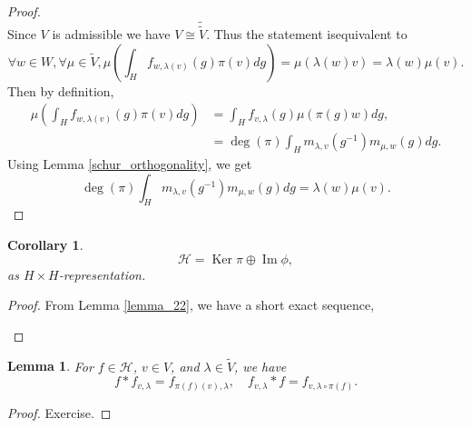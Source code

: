 \documentclass[8pt]{article}
\newtheorem{lemma}{Lemma}[section]
\newtheorem{corollary}{Corollary} [section]
\DeclareMathOperator{\End}{End}
\DeclareMathOperator{\Image}{Im}
\DeclareMathOperator{\Ker}{Ker}
\newcommand{\C}[0]{\mathbb{C}}
\newcommand{\hecke}[0]{\mathscr{H}}
\begin{document}
\begin{proof}
\begin{equation*}
  \end{equation*}
  Since $V$ is admissible we have $V\cong \widetilde{\widetilde{V}}$. Thus the statement isequivalent to 
  \begin{equation*}
    \forall w\in W,\forall\mu\in\widetilde{V},\mu\left(\int_Hf_{w,\lambda(v)}(g)\pi(v)dg\right) = \mu(\lambda(w)v) = \lambda(w)\mu(v).
    \end{equation*}
    Then by definition,
    \begin{align*}
      \mu\left(\int_Hf_{w,\lambda(v)}(g)\pi(v)dg\right) & = \int_H f_{v,\lambda}(g)\mu(\pi(g)w)dg,\\
      & = \deg(\pi)\int_Hm_{\lambda,v}(g^{-1})m_{\mu,w}(g)dg.
    \end{align*}
    Using Lemma \ref{schur_orthogonality}, we get 
    \begin{equation*}
      \deg(\pi)\int_Hm_{\lambda,v}(g^{-1})m_{\mu,w}(g)dg = \lambda(w)\mu(v).
    \end{equation*}
\end{proof}

\begin{corollary}
  \label{corollary_23}
  \begin{equation*}
    \hecke = \Ker\pi\oplus\Image\phi,
  \end{equation*}
  as $H\times H$-representation.
\end{corollary}

\begin{proof}
  From Lemma \ref{lemma_22}, we have a short exact sequence, 
  \begin{center}
  \end{center}
\end{proof}

\begin{lemma}
  For $f\in\hecke$, $v\in V$, and $\lambda\in\widetilde{V}$, we have 
  \begin{equation*}
    f\ast f_{v,\lambda} = f_{\pi(f)(v),\lambda},\quad f_{v,\lambda}\ast f = f_{v,\lambda\circ\pi(f)}.
  \end{equation*}
  \label{convolution_anti_commutativity}
\end{lemma}
\begin{proof}
  Exercise.
\end{proof}
\end{document}
